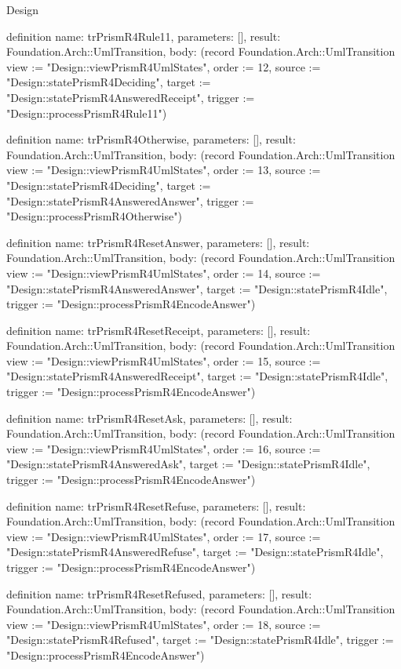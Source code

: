 \begin{lexlean}{Design}
\begin{semanticmodule}
definition{
  name: trPrismR4Rule11,
  parameters: [],
  result: Foundation.Arch::UmlTransition,
  body: (record Foundation.Arch::UmlTransition {view := "Design::viewPrismR4UmlStates", order := 12, source := "Design::statePrismR4Deciding", target := "Design::statePrismR4AnsweredReceipt", trigger := "Design::processPrismR4Rule11"})
}

definition{
  name: trPrismR4Otherwise,
  parameters: [],
  result: Foundation.Arch::UmlTransition,
  body: (record Foundation.Arch::UmlTransition {view := "Design::viewPrismR4UmlStates", order := 13, source := "Design::statePrismR4Deciding", target := "Design::statePrismR4AnsweredAnswer", trigger := "Design::processPrismR4Otherwise"})
}

definition{
  name: trPrismR4ResetAnswer,
  parameters: [],
  result: Foundation.Arch::UmlTransition,
  body: (record Foundation.Arch::UmlTransition {view := "Design::viewPrismR4UmlStates", order := 14, source := "Design::statePrismR4AnsweredAnswer", target := "Design::statePrismR4Idle", trigger := "Design::processPrismR4EncodeAnswer"})
}

definition{
  name: trPrismR4ResetReceipt,
  parameters: [],
  result: Foundation.Arch::UmlTransition,
  body: (record Foundation.Arch::UmlTransition {view := "Design::viewPrismR4UmlStates", order := 15, source := "Design::statePrismR4AnsweredReceipt", target := "Design::statePrismR4Idle", trigger := "Design::processPrismR4EncodeAnswer"})
}

definition{
  name: trPrismR4ResetAsk,
  parameters: [],
  result: Foundation.Arch::UmlTransition,
  body: (record Foundation.Arch::UmlTransition {view := "Design::viewPrismR4UmlStates", order := 16, source := "Design::statePrismR4AnsweredAsk", target := "Design::statePrismR4Idle", trigger := "Design::processPrismR4EncodeAnswer"})
}

definition{
  name: trPrismR4ResetRefuse,
  parameters: [],
  result: Foundation.Arch::UmlTransition,
  body: (record Foundation.Arch::UmlTransition {view := "Design::viewPrismR4UmlStates", order := 17, source := "Design::statePrismR4AnsweredRefuse", target := "Design::statePrismR4Idle", trigger := "Design::processPrismR4EncodeAnswer"})
}

definition{
  name: trPrismR4ResetRefused,
  parameters: [],
  result: Foundation.Arch::UmlTransition,
  body: (record Foundation.Arch::UmlTransition {view := "Design::viewPrismR4UmlStates", order := 18, source := "Design::statePrismR4Refused", target := "Design::statePrismR4Idle", trigger := "Design::processPrismR4EncodeAnswer"})
}


\end{semanticmodule}
\end{lexlean}

